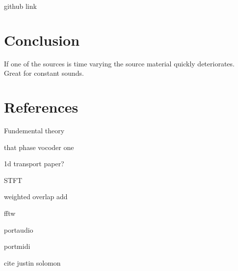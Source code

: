 \documentclass[12pt]{article}
\begin{document}
github link

\section{Conclusion}

If one of the sources is time varying the source material quickly deteriorates.
Great for constant sounds.

\section{References}

Fundemental theory

that phase vocoder one

1d transport paper?

STFT

weighted overlap add

fftw

portaudio

portmidi

cite justin solomon
\end{document}
